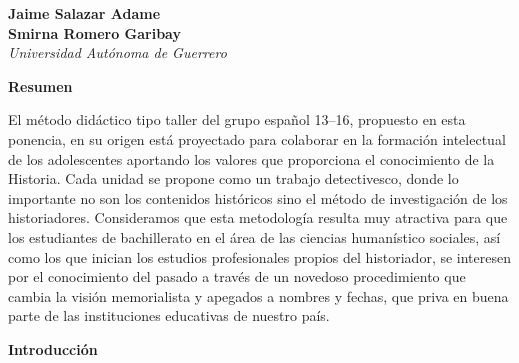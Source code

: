 %

\thispagestyle{empty}
{\par}
\setcounter{footnote}{0}

\bigskip
\begin{center}
{\bfseries Jaime Salazar Adame\\
Smirna Romero Garibay}\\
{\itshape Universidad Autónoma de Guerrero\/}
\end{center}

\bigskip
\textbf{Resumen}

\enlargethispage{1\baselineskip}
El método didáctico tipo taller del grupo español 13--16, propuesto en esta ponencia, en su origen está proyectado para colaborar en la 
formación intelectual de los adolescentes aportando los valores que 
proporciona el conocimiento de la Historia. Cada unidad se propone como un trabajo detectivesco, donde lo importante no son los contenidos históricos sino el método de investigación de los historiadores. 
Consideramos que esta metodología resulta muy atractiva para que los 
estudiantes de bachillerato en el área de las ciencias humanístico 
sociales, así como los que inician los estudios profesionales propios 
del historiador, se interesen por el conocimiento del pasado a través 
de un novedoso procedimiento que cambia la visión memorialista y 
apegados a nombres y fechas, que priva en buena parte de las 
instituciones educativas de nuestro país.

\medskip
\textbf{Introducción}


